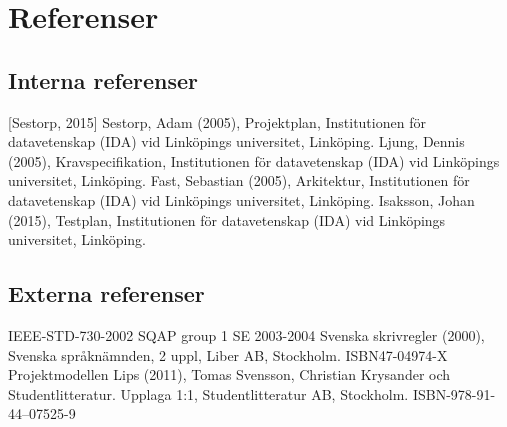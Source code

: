 \section{Referenser}


\subsection{Interna referenser}
[Sestorp, 2015] Sestorp, Adam (2005), Projektplan, Institutionen för datavetenskap
(IDA) vid Linköpings universitet, Linköping.
\newline
\newline
[Ljung, 2015] Ljung, Dennis (2005), Kravspecifikation, Institutionen för datavetenskap
(IDA) vid Linköpings universitet, Linköping.
\newline
\newline
[Fast, 2015] Fast, Sebastian (2005), Arkitektur, Institutionen för datavetenskap
(IDA) vid Linköpings universitet, Linköping.
\newline
\newline
[Isaksson, 2015] Isaksson, Johan (2015), Testplan, Institutionen för datavetenskap
(IDA) vid Linköpings universitet, Linköping.

\subsection{Externa referenser}
IEEE-STD-730-2002 SQAP group 1 SE 2003-2004
\newline
\newline
Svenska skrivregler (2000), Svenska språknämnden, 2 uppl, Liber AB, Stockholm. ISBN47-04974-X
\newline
\newline
Projektmodellen Lips (2011), Tomas Svensson, Christian Krysander och Studentlitteratur. Upplaga 1:1, Studentlitteratur AB, Stockholm. ISBN-978-91-44--07525-9